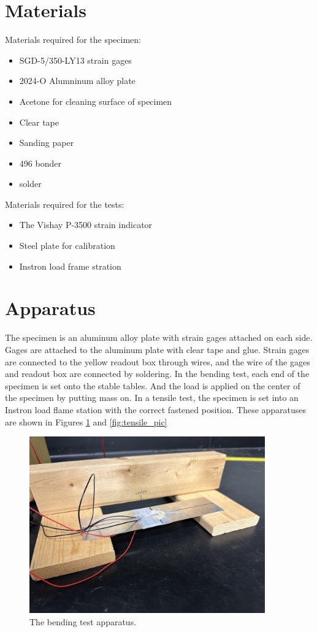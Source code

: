 \documentclass[12 pt]{report}
\begin{document}
\section{Materials} \label{sec:materials}
Materials required for the specimen:
\begin{itemize}
	\item SGD-5/350-LY13 strain gages
	\item 2024-O Alumninum alloy plate
	\item Acetone for cleaning surface of specimen
	\item Clear tape
	\item Sanding paper
	\item 496 bonder
	\item solder
\end{itemize}

Materials required for the tests:
\begin{itemize}
	\item The Vishay P-3500 strain indicator
	\item Steel plate for calibration
	\item Instron load frame stration
\end{itemize}

\section{Apparatus} \label{sec:apparatus}
The specimen is an aluminum alloy plate with strain gages attached on each side. Gages are attached to the aluminum plate with clear tape and glue. Strain gages are connected to the yellow readout box through wires, and the wire of the gages and readout box are connected by soldering. In the bending test, each end of the specimen is set onto the stable tables. And the load is applied on the center of the specimen by putting mass on. In a tensile test, the specimen is set into an Instron load flame station with the correct fastened position. These apparatuses are shown in Figures \ref{fig:bending_pic} and \ref{fig:tensile_pic}

\begin{figure}[htbp]
	\centering
	\includegraphics[width=4in]{images/IMG_1074}
	\caption{The bending test apparatus.}
	\label{fig:bending_pic}
\end{figure}
\end{document}
